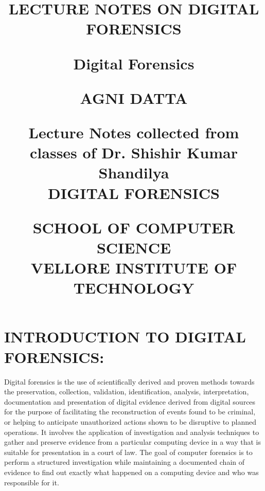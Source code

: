 \documentclass[10pt,british,english]{article}
\begin{document}
\title{\begin{center}          
   \vspace*{1cm}  
                   
\Huge         
\textbf{LECTURE NOTES ON DIGITAL FORENSICS}
                      
\vspace{0.5cm}          
\LARGE          
Digital Forensics 
                    
\vspace{1.5cm} 
                     
\textbf{AGNI DATTA}
                     
\vfill     
                 
Lecture Notes collected from classes of Dr. Shishir Kumar Shandilya\\          DIGITAL FORENSICS    
                 
\vspace{0.8cm}     
                                   
\Large          
SCHOOL OF COMPUTER SCIENCE\\          
VELLORE INSTITUTE OF TECHNOLOGY\\         
      
  \end{center}}

\maketitle
\pagebreak{}

\tableofcontents{}

\newpage{}

\part{INTRODUCTION TO DIGITAL FORENSICS:}

Digital forensics is the use of scientifically derived and proven
methods towards the preservation, collection, validation, identification,
analysis, interpretation, documentation and presentation of digital
evidence derived from digital sources for the purpose of facilitating
the reconstruction of events found to be criminal, or helping to anticipate
unauthorized actions shown to be disruptive to planned operations.
It involves the application of investigation and analysis techniques
to gather and preserve evidence from a particular computing device
in a way that is suitable for presentation in a court of law. The
goal of computer forensics is to perform a structured investigation
while maintaining a documented chain of evidence to find out exactly
what happened on a computing device and who was responsible for it.
\end{document}
